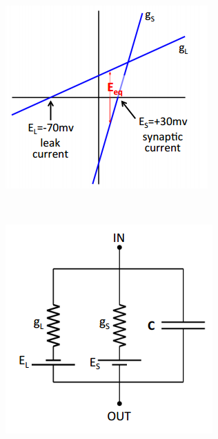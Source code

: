 \documentclass[a4paper, 12pt]{article}
\begin{document}
\begin{figure}[H]
	\centering
	\begin{subfigure}[b]{0.4\textwidth}
		\centering
		\includegraphics[width=\textwidth]{current_voltage_02.png}
	\end{subfigure}%
	~
	\begin{subfigure}[b]{0.4\textwidth}
		\centering
		\includegraphics[width=\textwidth]{membrane_circuit_03.png}
	\end{subfigure}
\end{figure}
\end{document}
